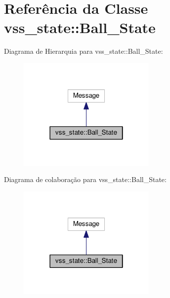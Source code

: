 \hypertarget{classvss__state_1_1Ball__State}{}\section{Referência da Classe vss\+\_\+state\+:\+:Ball\+\_\+\+State}
\label{classvss__state_1_1Ball__State}


Diagrama de Hierarquia para vss\+\_\+state\+:\+:Ball\+\_\+\+State\+:\nopagebreak
\begin{figure}[H]
\begin{center}
\leavevmode
\includegraphics[width=190pt]{classvss__state_1_1Ball__State__inherit__graph}
\end{center}
\end{figure}


Diagrama de colaboração para vss\+\_\+state\+:\+:Ball\+\_\+\+State\+:\nopagebreak
\begin{figure}[H]
\begin{center}
\leavevmode
\includegraphics[width=190pt]{classvss__state_1_1Ball__State__coll__graph}
\end{center}
\end{figure}
